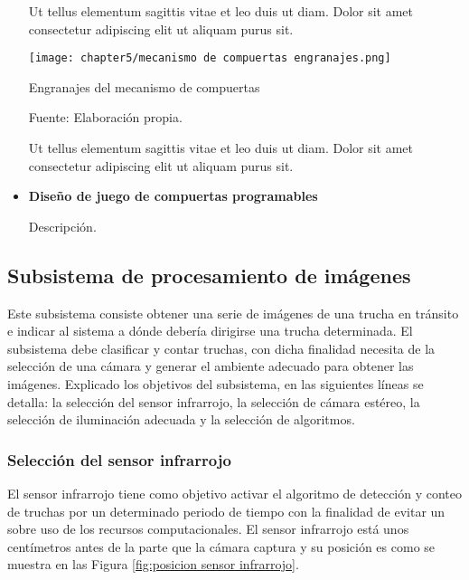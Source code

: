 \begin{itemize}
	Ut tellus elementum sagittis vitae et leo duis ut diam. Dolor sit amet consectetur adipiscing elit ut aliquam purus sit. 
	
	\begin{myfigure}[H]
		\centering
		\texttt{[image: chapter5/mecanismo de compuertas engranajes.png]}
		\caption{Engranajes del mecanismo de compuertas}
		\begin{myflushleftportland}
			Fuente: Elaboración propia.
		\end{myflushleftportland}
		\label{fig:mecanismo de compuertas engranajes}
	\end{myfigure}
	
	Ut tellus elementum sagittis vitae et leo duis ut diam. Dolor sit amet consectetur adipiscing elit ut aliquam purus sit. 
	
	
	\item \textbf{Diseño de juego de compuertas programables}
	
	Descripción.

\end{itemize}





\subsection{Subsistema de procesamiento de imágenes}
\label{ssec:subsistema de procesamiento de imágenes}

Este subsistema consiste obtener una serie de imágenes de una trucha en tránsito e indicar al sistema a dónde debería dirigirse una trucha determinada. El subsistema debe clasificar y contar truchas, con dicha finalidad necesita de la selección de una cámara y generar el ambiente adecuado para obtener las imágenes. Explicado los objetivos del subsistema, en las siguientes líneas se detalla: la selección del sensor infrarrojo, la selección de cámara estéreo, la selección de iluminación adecuada y la selección de algoritmos.

\subsubsection{Selección del sensor infrarrojo}

El sensor infrarrojo tiene como objetivo activar el algoritmo de detección y conteo de truchas por un determinado periodo de tiempo con la finalidad de evitar un sobre uso de los recursos computacionales. El sensor infrarrojo está unos centímetros antes de la parte que la cámara captura y su posición es como se muestra en las Figura \ref{fig:posicion sensor infrarrojo}.

